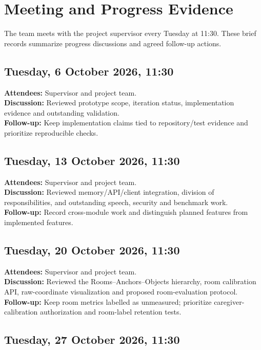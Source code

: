 \chapter{Meeting and Progress Evidence}
\label{app:meetings}

The team meets with the project supervisor every Tuesday at 11:30. These brief
records summarize progress discussions and agreed follow-up actions.

\section*{Tuesday, 6 October 2026, 11:30}
\textbf{Attendees:} Supervisor and project team.\\
\textbf{Discussion:} Reviewed prototype scope, iteration status, implementation
evidence and outstanding validation.\\
\textbf{Follow-up:} Keep implementation claims tied to repository/test evidence
and prioritize reproducible checks.

\section*{Tuesday, 13 October 2026, 11:30}
\textbf{Attendees:} Supervisor and project team.\\
\textbf{Discussion:} Reviewed memory/API/client integration, division of
responsibilities, and outstanding speech, security and benchmark work.\\
\textbf{Follow-up:} Record cross-module work and distinguish planned features
from implemented features.

\section*{Tuesday, 20 October 2026, 11:30}
\textbf{Attendees:} Supervisor and project team.\\
\textbf{Discussion:} Reviewed the Rooms--Anchors--Objects hierarchy, room
calibration API, raw-coordinate visualization and proposed room-evaluation
protocol.\\
\textbf{Follow-up:} Keep room metrics labelled as unmeasured; prioritize
caregiver-calibration authorization and room-label retention tests.

\section*{Tuesday, 27 October 2026, 11:30}

